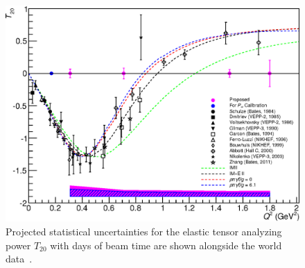 \begin{figure}
\begin{center}
\includegraphics[width=\textwidth]{figs/plot_t20_fit.eps} 
\caption{\label{PROJ-T20}Projected statistical uncertainties for the elastic tensor analyzing power $T_{20}$ with \productiondays days of beam time are shown alongside the world data~\cite{Holt:2012gg}.
}
\end{center}
\end{figure}

\clearpage

%





